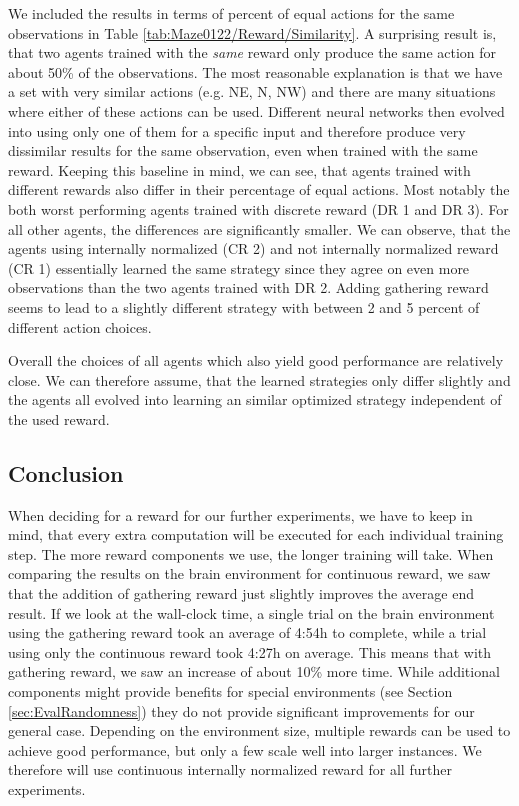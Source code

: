 We included the results in terms of percent of equal actions for the same observations in Table \ref{tab:Maze0122/Reward/Similarity}. A surprising result is, that two agents trained with the \textit{same} reward only produce the same action for about 50\% of the observations. The most reasonable explanation is that we have a set with very similar actions (e.g. NE, N, NW) and there are many situations where either of these actions can be used. Different neural networks then evolved into using only one of them for a specific input and therefore produce very dissimilar results for the same observation, even when trained with the same reward. Keeping this baseline in mind, we can see, that agents trained with different rewards also differ in their percentage of equal actions. Most notably the both worst performing agents trained with discrete reward (DR 1 and DR 3). For all other agents, the differences are significantly smaller. We can observe, that the agents using internally normalized (CR 2) and not internally normalized reward (CR 1) essentially learned the same strategy since they agree on even more observations than the two agents trained with DR 2. Adding gathering reward seems to lead to a slightly different strategy with between 2 and 5 percent of different action choices. 

Overall the choices of all agents which also yield good performance are relatively close. We can therefore assume, that the learned strategies only differ slightly and the agents all evolved into learning an similar optimized strategy independent of the used reward. 

\subsection{Conclusion} \label{sec:RewardConclusion}
When deciding for a reward for our further experiments, we have to keep in mind, that every extra computation will be executed for each individual training step. The more reward components we use, the longer training will take. When comparing the results on the brain environment for continuous reward, we saw that the addition of gathering reward just slightly improves the average end result. If we look at the wall-clock time, a single trial on the brain environment using the gathering reward took an average of 4:54h to complete, while a trial using only the continuous reward took 4:27h on average. This means that with gathering reward, we saw an increase of about 10\% more time. While additional components might provide benefits for special environments (see Section \ref{sec:EvalRandomness}) they do not provide significant improvements for our general case. Depending on the environment size, multiple rewards can be used to achieve good performance, but only a few scale well into larger instances. We therefore will use continuous internally normalized reward for all further experiments.

